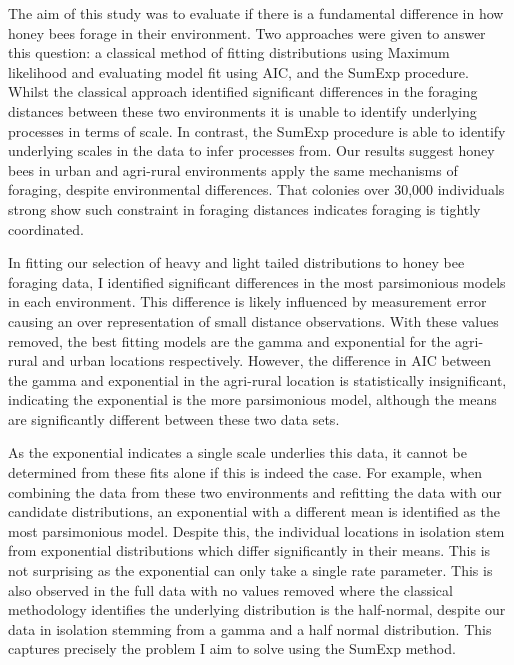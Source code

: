 \documentclass[11pt,usenames,dvipsnames,a4paper]{article}
\begin{document}
\begin{linenumbers}
\hspace{\parindent}
The aim of this study was to evaluate if there is a fundamental difference in how honey bees forage in their environment. Two approaches were given to answer this question: a classical method of fitting distributions using Maximum likelihood and evaluating model fit using AIC, and the SumExp procedure. Whilst the classical approach identified significant differences in the foraging distances between these two environments it is unable to identify underlying processes in terms of scale. In contrast, the SumExp procedure is able to identify underlying scales in the data to infer processes from. Our results suggest honey bees in urban and agri-rural environments apply the same mechanisms of foraging, despite environmental differences. That colonies over 30,000 individuals strong show such constraint in foraging distances indicates foraging is tightly coordinated.

In fitting our selection of heavy and light tailed distributions to honey bee foraging data, I identified significant differences in the most parsimonious models in each environment. This difference is likely influenced by measurement error causing an over representation of small distance observations. With these values removed, the best fitting models are the gamma and exponential for the agri-rural and urban locations respectively. However, the difference in AIC between the gamma and exponential in the agri-rural location is statistically insignificant, indicating the exponential is the more parsimonious model, although the means are significantly different between these two data sets.

As the exponential indicates a single scale underlies this data, it cannot be determined from these fits alone if this is indeed the case. For example, when combining the data from these two environments and refitting the data with our candidate distributions, an exponential with a different mean is identified as the most parsimonious model. Despite this, the individual locations in isolation stem from exponential distributions which differ significantly in their means. This is not surprising as the exponential can only take a single rate parameter. This is also observed in the full data with no values removed where the classical methodology identifies the underlying distribution is the half-normal, despite our data in isolation stemming from a gamma and a half normal distribution. This captures precisely the problem I aim to solve using the SumExp method. 


\end{linenumbers}
\end{document}
